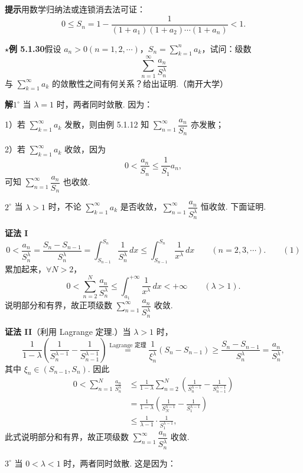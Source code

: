 \documentclass[UTF8,12pt,a4paper,fontset=fandol]{ctexart}
\begin{document}
\noindent\textbf{提示}\quad 用数学归纳法或连锁消去法可证：
\[
  0\le S_n=
  1-\frac1{(1+a_1)(1+a_2)\cdots(1+a_n)}<1.
\]

\noindent\textbf{$\star$例 5.1.30}\quad 假设 $a_n>0(n=1,2,\cdots)$，$S_n=\displaystyle\sum_{k=1}^n a_k$，试问：级数
\[
  \sum_{n=1}^\infty\frac{a_n}{S_n^\lambda}
\]
与 $\displaystyle\sum_{k=1}^\infty a_k$ 的敛散性之间有何关系？给出证明.（南开大学）

\noindent\textbf{解}\quad $1^\circ$ 当 $\lambda=1$ 时，两者同时敛散. 因为：

1）若 $\displaystyle\sum_{k=1}^\infty a_k$ 发散，则由例 5.1.12 知 $\displaystyle\sum_{n=1}^\infty\dfrac{a_n}{S_n}$ 亦发散；

2）若 $\displaystyle\sum_{k=1}^\infty a_k$ 收敛，因为
\[
  0<\frac{a_n}{S_n}\le\frac1{S_1}a_n,
\]
可知 $\displaystyle\sum_{n=1}^\infty\dfrac{a_n}{S_n}$ 也收敛.

$2^\circ$ 当 $\lambda>1$ 时，不论 $\displaystyle\sum_{k=1}^\infty a_k$ 是否收敛，$\displaystyle\sum_{n=1}^\infty\dfrac{a_n}{S_n^\lambda}$ 恒收敛. 下面证明.

\noindent\textbf{证法 I}\quad
\[
  0<\frac{a_n}{S_n^\lambda}
  =\frac{S_n-S_{n-1}}{S_n^\lambda}
  =\int_{S_{n-1}}^{S_n}\frac1{S_n^\lambda}\,dx
  \le\int_{S_{n-1}}^{S_n}\frac1{x^\lambda}\,dx
  \qquad(n=2,3,\cdots).
\qquad(1)
\]
累加起来，$\forall N>2$，
\[
  0<\sum_{n=2}^N\frac{a_n}{S_n^\lambda}
  \le\int_{a_1}^{+\infty}\frac1{x^\lambda}\,dx<+\infty
  \qquad(\lambda>1).
\]
说明部分和有界，故正项级数 $\displaystyle\sum_{n=1}^\infty\dfrac{a_n}{S_n^\lambda}$ 收敛.

\noindent\textbf{证法 II}\quad （利用 Lagrange 定理.）当 $\lambda>1$ 时，
\[
  \frac1{1-\lambda}\left(\frac1{S_n^{\lambda-1}}-\frac1{S_{n-1}^{\lambda-1}}\right)
  \stackrel{\text{Lagrange 定理}}{=}
  \frac1{\xi_n^\lambda}(S_n-S_{n-1})
  \ge\frac{S_n-S_{n-1}}{S_n^\lambda}
  =\frac{a_n}{S_n^\lambda},
\]
其中 $\xi_n\in(S_{n-1},S_n)$. 因此
\[
\begin{aligned}
0<\sum_{n=1}^N\frac{a_n}{S_n^\lambda}
&\le\frac1{1-\lambda}\sum_{n=2}^N\left(\frac1{S_n^{\lambda-1}}-\frac1{S_{n-1}^{\lambda-1}}\right)\\
&=\frac1{1-\lambda}\left(\frac1{S_N^{\lambda-1}}-\frac1{S_1^{\lambda-1}}\right)\\
&\le\frac1{\lambda-1}\cdot\frac1{S_1^{\lambda-1}},
\end{aligned}
\]
此式说明部分和有界，故正项级数 $\displaystyle\sum_{n=1}^\infty\dfrac{a_n}{S_n^\lambda}$ 收敛.

$3^\circ$ 当 $0<\lambda<1$ 时，两者同时敛散. 这是因为：
\end{document}
